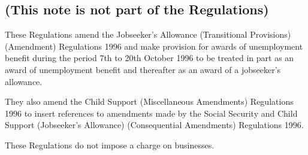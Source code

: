 \documentclass[a4paper]{article}
\newcommand{\parthead}{}
\begin{document}
\renewcommand\parthead{--- Explanatory Note}

\subsection*{(This note is not part of the Regulations)}

These Regulations amend the Jobseeker’s Allowance (Transitional Provisions) (Amendment) Regulations 1996 and make provision for awards of unemployment benefit during the period 7th to 20th October 1996 to be treated in part as an award of unemployment benefit and thereafter as an award of a jobseeker’s allowance.

  They also amend the Child Support (Miscellaneous Amendments) Regulations 1996 to insert references to amendments made by the Social Security and Child Support (Jobseeker’s Allowance) (Consequential Amendments) Regulations 1996.

  These Regulations do not impose a charge on businesses.
\end{document}

